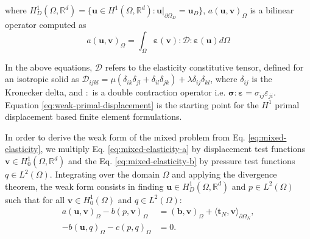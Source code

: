 \documentclass[english,11pt,3p,number,sort&compress]{elsarticle}
\begin{document}
\noindent where $H^1_D(\Omega,\mathbb{R}^d)=\{\bm{u} \in H^1(\Omega,\mathbb{R}^d) : \bm{u} \lvert_{\partial\Omega_D}=\bm{u}_D\}$, $a\left(\bm{u},\bm{v}\right)_\Omega$ is a bilinear operator computed as
\begin{equation*}
	a\left(\bm{u},\bm{v}\right)_\Omega = \int_{\Omega} \bm{\varepsilon}(\bm{v}) : \mathcal{D} : \bm{\varepsilon}(\bm{u}) d\Omega
\end{equation*}

In the above equations, $\mathcal{D}$ refers to the elasticity constitutive tensor, defined for an isotropic solid as $\mathcal{D}_{ijkl} = \mu(\delta_{ik}\delta_{jl}+\delta_{il}\delta_{jk})+\lambda\delta_{ij}\delta_{kl}$, where $\delta_{ij}$ is the Kronecker delta, and $:$ is a double contraction operator i.e. $\bm{\sigma}:\bm{\varepsilon} = \sigma_{ij}\varepsilon_{ji}$. Equation \eqref{eq:weak-primal-displacement} is the starting point for the $H^1$ primal displacement based finite element formulations.

In order to derive the weak form of the mixed problem from Eq. \eqref{eq:mixed-elasticity}, we multiply Eq. \eqref{eq:mixed-elasticity-a} by displacement test functions $\bm{v} \in H^1_0(\Omega,\mathbb{R}^d)$ and the Eq. \eqref{eq:mixed-elasticity-b} by pressure test functions $q \in L^2(\Omega)$. Integrating over the domain $\Omega$ and applying the divergence theorem, the weak form consists in finding $\bm{u} \in H^1_D(\Omega,\mathbb{R}^d)$ and $p \in L^2(\Omega)$ such that for all $\bm{v} \in H^1_0(\Omega)$ and $q \in L^2(\Omega)$:
\begin{subequations} \label{eq:weak-mixed}
	\begin{align}
		a\left(\bm{u},\bm{v}\right)_\Omega - b\left( p, \bm{v}\right)_\Omega &= \left(\bm{b},\bm{v}\right)_\Omega + \langle\bm{t}_N,\bm{v}\rangle_{\partial\Omega_N} ,\label{eq:weak-mixed-a}\\ 
		-b\left(\bm{u}, q\right)_\Omega - c\left(p,q \right)_\Omega &= 0 . \label{eq:weak-mixed-b}
	\end{align}
\end{subequations}
\end{document}
